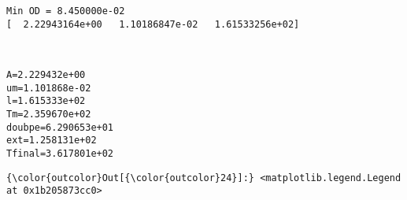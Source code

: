 \documentclass[11pt]{article}
\begin{document}
    \begin{Verbatim}[commandchars=\\\{\}]
Min OD = 8.450000e-02
[  2.22943164e+00   1.10186847e-02   1.61533256e+02]

    \end{Verbatim}

    \begin{center}
    \end{center}
    { \hspace*{\fill} \\}
    
    \begin{Verbatim}[commandchars=\\\{\}]
A=2.229432e+00
um=1.101868e-02
l=1.615333e+02
Tm=2.359670e+02
doubpe=6.290653e+01
ext=1.258131e+02
Tfinal=3.617801e+02

    \end{Verbatim}

            \begin{Verbatim}[commandchars=\\\{\}]
{\color{outcolor}Out[{\color{outcolor}24}]:} <matplotlib.legend.Legend at 0x1b205873cc0>
\end{Verbatim}
        
    \begin{center}
    \end{center}
    { \hspace*{\fill} \\}
    
    \begin{center}
    \end{center}
    { \hspace*{\fill} \\}
    
\end{document}
